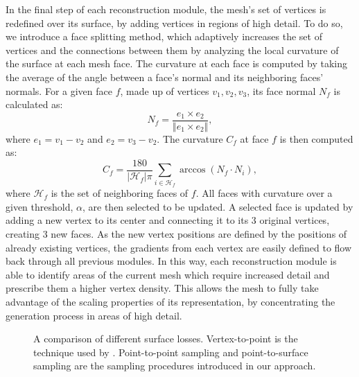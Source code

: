 \documentclass{article}
\begin{document}
In the final step of each reconstruction module, the mesh's set of vertices is redefined over its surface, by adding vertices in regions of high detail. To do so, we introduce a face splitting method, which adaptively increases the set of vertices and the connections between them by analyzing the local curvature of the surface at each mesh face. 
The curvature at each face is computed by taking the average of the angle between a face's normal and its neighboring faces' normals. For a given face $f$, made up of vertices $v_1, v_2, v_3$, its face normal $N_f$ is calculated as:
\begin{equation}
N_f = \frac{e_1 \times e_2}{\Vert e_1 \times e_2 \Vert},
\end{equation}
where $e_1 = v_1-v_2$ and $e_2 = v_3-v_2$. The curvature $C_f$ at face $f$ is then computed as: 
\begin{equation}
C_f = \frac{180}{|\mathcal{H}_f|\pi} \sum_{i \in \mathcal{H}_f} \arccos{(N_{f} \cdot N_{i})},
\end{equation}
where $\mathcal{H}_f$ is the set of neighboring faces of $f$.
All faces with curvature over a given threshold, $\alpha$, are then selected to be updated. A selected face is updated by adding a new vertex to its center and connecting it to its 3 original vertices, creating 3 new faces. As the new vertex positions are defined by the positions of already existing vertices, the gradients from each vertex are easily defined to flow back through all previous modules. In this way, each reconstruction module is able to identify areas of the current mesh which require increased detail and prescribe them a higher vertex density. This allows the mesh to fully take advantage of the scaling properties of its representation, by concentrating the generation process in areas of high detail.

\begin{figure}[t!]
\caption{A comparison of different surface losses. Vertex-to-point is the technique used by \citet{Pixel2Mesh}. Point-to-point sampling and point-to-surface sampling are the sampling procedures introduced in our approach.}
\label{fig:LossComparison}
\end{figure}
\end{document}
